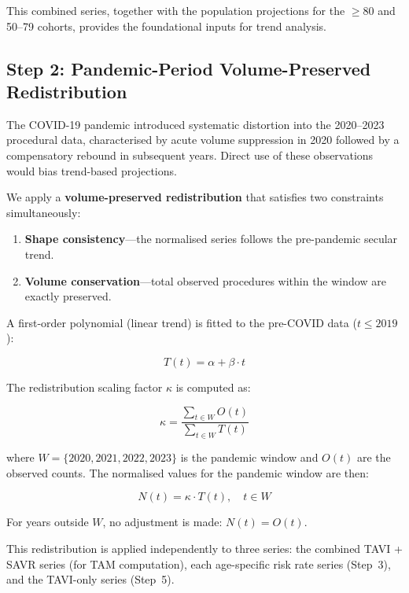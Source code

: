 \documentclass[12pt, a4paper]{article}
\begin{document}
This combined series, together with the population projections for the $\geq$80 and 50--79 cohorts, provides the foundational inputs for trend analysis.

\subsection{Step 2: Pandemic-Period Volume-Preserved Redistribution}

The COVID-19 pandemic introduced systematic distortion into the 2020--2023 procedural data, characterised by acute volume suppression in 2020 followed by a compensatory rebound in subsequent years. Direct use of these observations would bias trend-based projections.

We apply a \textbf{volume-preserved redistribution} that satisfies two constraints simultaneously:

\begin{enumerate}[leftmargin=*, itemsep=2pt]
    \item \textbf{Shape consistency}---the normalised series follows the pre-pandemic secular trend.
    \item \textbf{Volume conservation}---total observed procedures within the window are exactly preserved.
\end{enumerate}

A first-order polynomial (linear trend) is fitted to the pre-COVID data ($t \leq 2019$):

\begin{equation}
    T(t) = \alpha + \beta \cdot t
\end{equation}

The redistribution scaling factor $\kappa$ is computed as:

\begin{equation}
    \kappa = \frac{\displaystyle\sum_{t \in W} O(t)}{\displaystyle\sum_{t \in W} T(t)}
\end{equation}

\noindent where $W = \{2020, 2021, 2022, 2023\}$ is the pandemic window and $O(t)$ are the observed counts. The normalised values for the pandemic window are then:

\begin{equation}
    N(t) = \kappa \cdot T(t), \quad t \in W
\end{equation}

For years outside $W$, no adjustment is made: $N(t) = O(t)$.

This redistribution is applied independently to three series: the combined TAVI + SAVR series (for TAM computation), each age-specific risk rate series (Step~3), and the TAVI-only series (Step~5).
\end{document}
